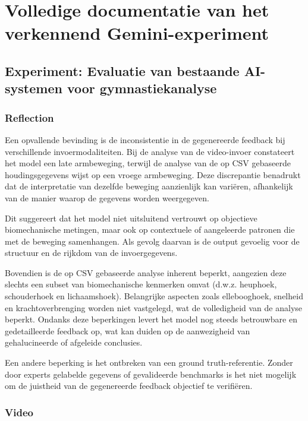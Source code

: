 \chapter{Volledige documentatie van het verkennend Gemini-experiment}
\label{app:gemini-experiment}

\section{Experiment: Evaluatie van bestaande AI-systemen voor gymnastiekanalyse}

\subsection*{Reflection}

Een opvallende bevinding is de inconsistentie in de gegenereerde feedback bij verschillende invoermodaliteiten. Bij de analyse van de video-invoer constateert het model een late armbeweging, terwijl de analyse van de op CSV gebaseerde houdingsgegevens wijst op een vroege armbeweging. Deze discrepantie benadrukt dat de interpretatie van dezelfde beweging aanzienlijk kan variëren, afhankelijk van de manier waarop de gegevens worden weergegeven.

Dit suggereert dat het model niet uitsluitend vertrouwt op objectieve biomechanische metingen, maar ook op contextuele of aangeleerde patronen die met de beweging samenhangen. Als gevolg daarvan is de output gevoelig voor de structuur en de rijkdom van de invoergegevens.

Bovendien is de op CSV gebaseerde analyse inherent beperkt, aangezien deze slechts een subset van biomechanische kenmerken omvat (d.w.z. heuphoek, schouderhoek en lichaamshoek). Belangrijke aspecten zoals ellebooghoek, snelheid en krachtoverbrenging worden niet vastgelegd, wat de volledigheid van de analyse beperkt. Ondanks deze beperkingen levert het model nog steeds betrouwbare en gedetailleerde feedback op, wat kan duiden op de aanwezigheid van gehalucineerde of afgeleide conclusies.

Een andere beperking is het ontbreken van een ground truth-referentie. Zonder door experts gelabelde gegevens of gevalideerde benchmarks is het niet mogelijk om de juistheid van de gegenereerde feedback objectief te verifiëren.

\newpage
\subsection{Video}

